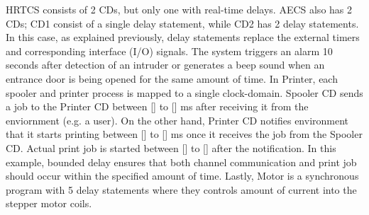 
HRTCS consists of 2 CDs, but only one with real-time delays. AECS also
has 2 CDs; CD1 consist of a single delay statement, while CD2 has 2
delay statements. In this case, as explained previously, delay
statements replace the external timers and corresponding interface (I/O)
signals. The system triggers an alarm 10 seconds after detection of an
intruder or generates a beep sound when an entrance door is being opened
for the same amount of time. In Printer, each spooler and printer
process is mapped to a single clock-domain. Spooler CD sends a job to
the Printer CD between [] to [] ms after receiving it from the
enviornment (e.g. a user). On the other hand, Printer CD notifies
environment that it starts printing between [] to [] ms once it receives
the job from the Spooler CD. Actual print job is started between [] to
[] after the notification. In this example, bounded delay ensures that
both channel communication and print job should occur within the
specified amount of time. Lastly, Motor is a synchronous program with 5
delay statements where they controls amount of current into the stepper
motor coils. 





